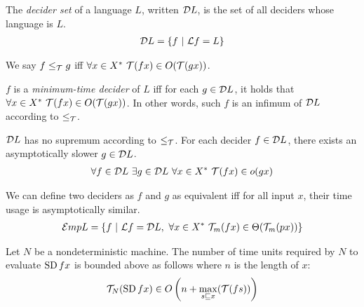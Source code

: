 \begin{mdef}
    The \emph{decider set} of a language $L$, written $\mathcal D L$, is
    the set of all deciders whose language is $L$.
    \begin{align}
        \mathcal D L = \{ f ~|~ \mathcal L f = L \}
    \end{align}
\end{mdef}

\begin{mdef}
    We say $f \le_{\mathcal{T}} g$ iff $\forall x \in X^* ~ \mathcal{T}(fx) \in O(\mathcal{T}(gx))$.
\end{mdef}

\begin{mdef}
    $f$ is a \emph{minimum-time decider} of $L$ iff for each $g \in \mathcal D L$,
    it holds that $\forall x \in X^* ~ \mathcal{T}(fx) \in O(\mathcal{T}(gx))$.
    In other words, such $f$ is an infimum of $\mathcal D L$ according to $\le_{\mathcal{T}}$.
\end{mdef}

\begin{msco}
    $\mathcal D L$ has no supremum according to $\le_{\mathcal{T}}$.
    For each decider $f \in \mathcal D L$, there exists an asymptotically slower $g \in \mathcal D L$.
    \begin{align}
        \forall f \in \mathcal D L ~ \exists g \in \mathcal D L ~ \forall x \in X^* ~ \mathcal{T}(fx) \in o(gx)
    \end{align}
\end{msco}

\begin{mcor}
    We can define two deciders as $f$ and $g$
    as equivalent iff for all input $x$,
    their time usage is asymptotically similar.
    \begin{align}
        \mathcal E m p L = \{ f ~|~ \mathcal L f = \mathcal D L, ~ \forall x \in X^* ~ \mathcal{T}_m(fx) \in \Theta(\mathcal{T}_m(px)) \}
    \end{align}
\end{mcor}

\begin{msco}
    Let $N$ be a nondeterministic machine.
    The number of time units required by $N$
    to evaluate $\operatorname{SD} fx$ is bounded above as follows
    where $n$ is the length of $x$:
    \begin{align}
        \mathcal{T}_N(\operatorname{SD} fx) \in O\left(n + \max_{s \sqsubseteq x} (\mathcal{T}(fs))\right)
    \end{align}
\end{msco}

